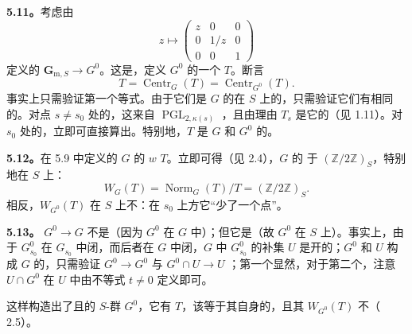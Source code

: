 \textbf{5.11。}考虑由
\[
z\longmapsto\begin{pmatrix}z&0&0\\0&1/z&0\\0&0&1\end{pmatrix}
\]
定义的 $\mathbf G_{\mathrm m,S}\to G^0$。这是，定义 $G^0$ 的一个 $T$。断言
\[
T=\operatorname{Centr}_G(T)=\operatorname{Centr}_{G^0}(T).
\]
事实上只需验证第一个等式。由于它们是 $G$ 的在 $S$ 上的，只需验证它们有相同的。对点 $s\ne s_0$ 处的，这来自 $\operatorname{PGL}_{2,\kappa(s)}$ ，且由理由 $T_s$ 是它的（见 1.11）。对 $s_0$ 处的，立即可直接算出。特别地，$T$ 是 $G$ 和 $G^0$ 的。

\textbf{5.12。}在 5.9 中定义的 $G$ 的 $w$  $T$。立即可得（见 2.4），$G$ 的 于 $(\mathbb Z/2\mathbb Z)_S$，特别地在 $S$ 上：
\[
W_G(T)=\operatorname{Norm}_G(T)/T=(\mathbb Z/2\mathbb Z)_S.
\]
相反，$W_{G^0}(T)$ 在 $S$ 上不：在 $s_0$ 上方它“少了一个点”。

\textbf{5.13。} $G^0\to G$ 不是（因为 $G^0$ 在 $G$ 中）；但它是（故 $G^0$ 在 $S$ 上）。事实上，由于 $G_{s_0}^0$ 在 $G_{s_0}$ 中闭，而后者在 $G$ 中闭，$G$ 中 $G_{s_0}^0$ 的补集 $U$ 是开的；$G^0$ 和 $U$ 构成 $G$ 的，只需验证 $G^0\to G^0$ 与 $G^0\cap U\to U$ ；第一个显然，对于第二个，注意 $U\cap G^0$ 在 $U$ 中由不等式 $t\ne0$ 定义即可。

这样构造出了且的 $S$-群 $G^0$，它有 $T$，该等于其自身的，且其  $W_{G^0}(T)$ 不（ 2.5）。


